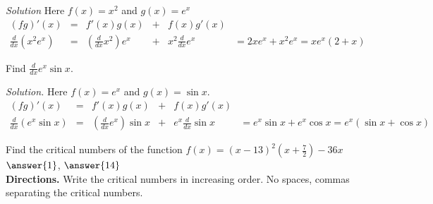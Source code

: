 \documentclass{ximera}
\begin{document}
\textit{Solution} Here \(f(x)=x^2\) and \(g(x)=e^x\)
\[\begin{array}{cccccc}
 (f g)'(x) & = & f'(x) g(x) & + & f(x) g'(x) &   \\
 \displaystyle \frac{d}{d x}\left(x^2 e^x\right) & = & \displaystyle  \left(\frac{d}{d x}x^2\right)e^x & + & \displaystyle  x^2\frac{d}{d x}e^x & =2x e^x+x^2e^x=x e^x(2+x)
\end{array}\]

\begin{example} \rm{ Find \(\displaystyle \frac{d}{d x} e^x\sin  x\).}\label{productRule-1-ex02}\end{example} 

\noindent \textit{Solution. }  Here \(f(x)=e^x\) and \(g(x)=\sin  x\).
\[\begin{array}{cccccc}
 (f g)'(x) & = & f'(x) g(x) & + & f(x) g'(x) &   \\
 \displaystyle  \frac{d}{d x}\left( e^x\sin  x\right)  & = & \displaystyle  \left(\frac{d}{d x}e^x\right)\sin  x & + &  \displaystyle e^x\frac{d}{d x}\sin  x & \displaystyle  =e^x\sin  x+e^x\cos  x=e^x(\sin
 x+\cos  x) 
\end{array}\]

 
 
\begin{problem}Find the critical numbers of the function \(\displaystyle f(x) = (x-13)^2\left(x+\frac{7}{2}\right)-36x\) \\ $\answer{1}$,  $\answer{14}$\\ \textbf{Directions.} Write the critical numbers in increasing order. No spaces, commas separating the critical numbers.\end{problem} 
\end{document}
